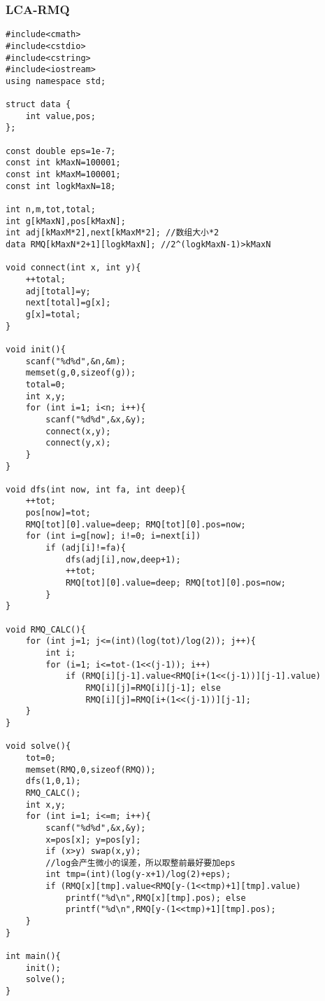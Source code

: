 \subsubsection{LCA-RMQ}
\begin{verbatim}
#include<cmath>
#include<cstdio>
#include<cstring>
#include<iostream>
using namespace std;

struct data {
    int value,pos;
};

const double eps=1e-7;
const int kMaxN=100001;
const int kMaxM=100001;
const int logkMaxN=18;

int n,m,tot,total;
int g[kMaxN],pos[kMaxN];
int adj[kMaxM*2],next[kMaxM*2]; //数组大小*2
data RMQ[kMaxN*2+1][logkMaxN]; //2^(logkMaxN-1)>kMaxN

void connect(int x, int y){
    ++total;
    adj[total]=y;
    next[total]=g[x];
    g[x]=total;
}

void init(){
    scanf("%d%d",&n,&m);
    memset(g,0,sizeof(g));
    total=0;
    int x,y;
    for (int i=1; i<n; i++){
        scanf("%d%d",&x,&y);
        connect(x,y);
        connect(y,x);
    }
}

void dfs(int now, int fa, int deep){
    ++tot;
    pos[now]=tot;
    RMQ[tot][0].value=deep; RMQ[tot][0].pos=now;
    for (int i=g[now]; i!=0; i=next[i])
        if (adj[i]!=fa){
            dfs(adj[i],now,deep+1);
            ++tot;
            RMQ[tot][0].value=deep; RMQ[tot][0].pos=now;
        }
}

void RMQ_CALC(){
    for (int j=1; j<=(int)(log(tot)/log(2)); j++){
        int i;
        for (i=1; i<=tot-(1<<(j-1)); i++)
            if (RMQ[i][j-1].value<RMQ[i+(1<<(j-1))][j-1].value)
                RMQ[i][j]=RMQ[i][j-1]; else
                RMQ[i][j]=RMQ[i+(1<<(j-1))][j-1];
    }
}

void solve(){
    tot=0;
    memset(RMQ,0,sizeof(RMQ));
    dfs(1,0,1);
    RMQ_CALC();
    int x,y;
    for (int i=1; i<=m; i++){
        scanf("%d%d",&x,&y);
        x=pos[x]; y=pos[y];
        if (x>y) swap(x,y);
        //log会产生微小的误差，所以取整前最好要加eps
        int tmp=(int)(log(y-x+1)/log(2)+eps);
        if (RMQ[x][tmp].value<RMQ[y-(1<<tmp)+1][tmp].value)
            printf("%d\n",RMQ[x][tmp].pos); else
            printf("%d\n",RMQ[y-(1<<tmp)+1][tmp].pos);
    }
}

int main(){
    init();
    solve();
}
\end{verbatim} 
